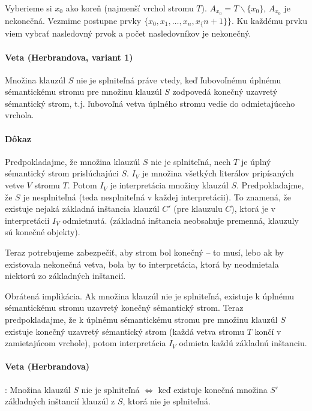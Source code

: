 \par Vyberieme si $x_0$ ako koreň (najmenší vrchol stromu $T$). $A_{x_0} =
T \backslash \{x_0\}$, $A_{x_0}$ je nekonečná. Vezmime postupne prvky $\{x_0,
x_1, \ldots , x_n, x_\{n+1\}\}$. Ku každému prvku viem vybrať nasledovný prvok a
počet nasledovníkov je nekonečný. 

\paragraph{Veta (Herbrandova, variant 1)} Množina klauzúl $S$ nie je splniteľná
práve vtedy, keď ľubovoľnému úplnému sémantickému stromu pre množinu klauzúl
$S$ zodpovedá konečný uzavretý sémantický strom, t.j. ľubovoľná vetva úplného
stromu vedie do odmietajúceho vrchola.

\paragraph{Dôkaz} Predpokladajme, že množina klauzúl $S$ nie je splniteľná, nech
$T$ je úplný sémantický strom prislúchajúci $S$. $I_V$ je množina všetkých
literálov pripísaných vetve $V$ stromu $T$. Potom $I_V$ je interpretácia
množiny klauzúl $S$. Predpokladajme, že $S$ je nesplniteľná (teda nesplniteľná v
každej interpretácii). To znamená, že existuje nejaká základná inštancia klauzúl
$C'$ (pre klauzulu $C$), ktorá je v interpretácii $I_V$ odmietnutá. (základná
inštancia neobsahuje premenná, klauzuly sú konečné objekty). 
\par Teraz potrebujeme zabezpečiť, aby strom bol konečný -- to musí, lebo ak by
existovala nekonečná vetva, bola by to interpretácia, ktorá by neodmietala
niektorú zo základných inštancií.

\par Obrátená implikácia. Ak množina klauzúl nie je splniteľná, existuje k
úplnému sémantickému stromu uzavretý konečný sémantický strom. Teraz
predpokladajme, že k úplnému sémantickému stromu pre množinu klauzúl
$S$ existuje konečný uzavretý sémantický strom (každá vetva stromu $T$ končí v
zamietajúcom vrchole), potom interpretácia $I_V$ odmieta každú základnú
inštanciu.


\paragraph{Veta (Herbrandova)}: Množina klauzúl $S$ nie je splniteľná $\iff$ keď
existuje konečná množina $S'$ základných inštancií klauzúl z $S$, ktorá nie je
splniteľná. \fixme{}

